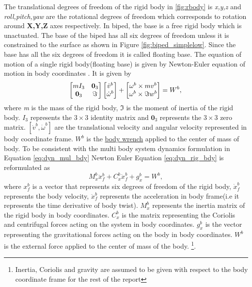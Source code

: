 The translational degrees of freedom of the rigid body in \ref{fig:rbody} is \emph{x,y,z} and \emph{roll,pitch,yaw} are the rotational degrees of freedom which corresponds to rotation around \textbf{X,Y,Z} axes respectively. In biped, the base is a free rigid body which is unactuated. The base of the biped has all six degrees of freedom unless it is constrained to the surface as shown in Figure \ref{fig:biped_simplelow}. Since the base has all the six degrees of freedom it is called floating base. The equation of motion of a single rigid body(floating base) is given by Newton-Euler equation of motion in body coordinates \cite[Chapter 4]{mur94}. It is given by 
\begin{equation}
\label{eq:dyn_rig_bdy}
\begin{bmatrix}
mI_3 & \textbf{0}_3 \\ \textbf{0}_3 &\Im
\end{bmatrix}
\begin{bmatrix}
\dot{v}^b\\ \dot{\omega}^b
\end{bmatrix}
+ \begin{bmatrix}
\omega^b \times mv^b \\ 
\omega^b \times \Im w^b
\end{bmatrix}
= W^b,\\
\end{equation}
where \emph{m} is the mass of the rigid body, $\Im$ is the moment of inertia of the rigid body. $I_3$ represents the $3 \times 3$ identity matrix and $ \textbf{0}_3$ represents the  $3 \times 3$ zero matrix. $[\dot{v}^b,\dot{\omega}^b]$ are the translational velocity and angular velocity represented in body coordinate frame. $W^b$ is the \underline{body wrench}  applied to the center of mass of body. To be consistent with the multi body system dynamics formulation in Equation \ref{eq:dyn_mul_bdy} Newton Euler Equation \ref{eq:dyn_rig_bdy} is reformulated as
\begin{equation}
\label{eq:dyn_rig_bdy_sh}
M_x^b \ddot{x}_f^b + C_x^b\dot{x}_f^b+g_x^b = W^b,
\end{equation}
 where $x_f^b$ is a vector that represents six degrees of freedom of the rigid body, $\dot{x}_f^b$ represents the body velocity, $\ddot{x}_f^b$ represents the acceleration in body frame(i.e it represents the time derivative of body twist). $M_x^b$ represents the inertia matrix of the rigid body in body coordinates. $C_x^b$ is the matrix representing the Coriolis and centrifugal forces acting on the system in body coordinates. $g_x^b$ is the vector representing the gravitational forces acting on the body in body coordinates. $W^b$ is the external force applied to the center of mass of the body. \footnote[2]{Inertia, Coriolis and gravity are assumed to be given with respect to the body coordinate frame for the rest of the report}.

